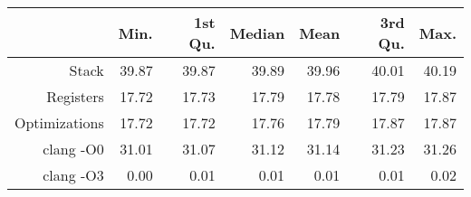 \begin{table}[ht]
\centering
\begin{tabular}{rrrrrrr}
  \hline
 & Min. & 1st Qu. & Median & Mean & 3rd Qu. & Max. \\ 
  \hline
Stack & 39.87 & 39.87 & 39.89 & 39.96 & 40.01 & 40.19 \\ 
  Registers & 17.72 & 17.73 & 17.79 & 17.78 & 17.79 & 17.87 \\ 
  Optimizations & 17.72 & 17.72 & 17.76 & 17.79 & 17.87 & 17.87 \\ 
  clang -O0 & 31.01 & 31.07 & 31.12 & 31.14 & 31.23 & 31.26 \\ 
  clang -O3 & 0.00 & 0.01 & 0.01 & 0.01 & 0.01 & 0.02 \\ 
   \hline
\end{tabular}
\end{table}
